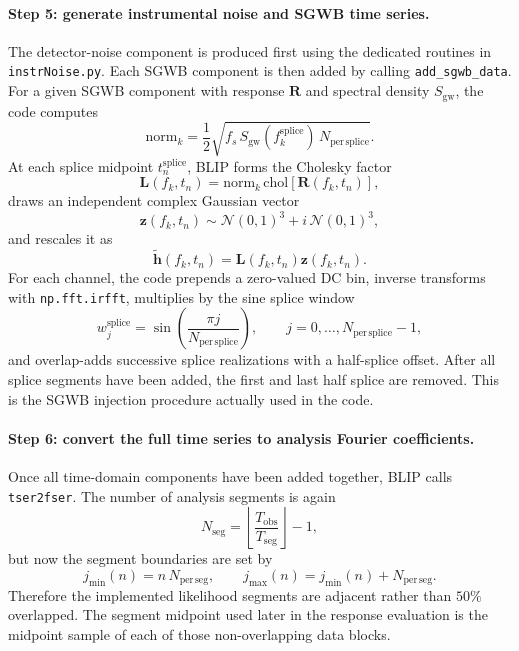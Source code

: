 \documentclass[11pt]{article}
\begin{document}
\paragraph{Step 5: generate instrumental noise and SGWB time series.}
The detector-noise component is produced first using the dedicated routines in \texttt{instrNoise.py}. Each SGWB component is then added by calling \texttt{add\_sgwb\_data}. For a given SGWB component with response $\mathbf{R}$ and spectral density $S_{\mathrm{gw}}$, the code computes
\begin{equation}
\mathrm{norm}_k=\frac{1}{2}\sqrt{f_s\,S_{\mathrm{gw}}(f_k^{\mathrm{splice}})\,N_{\mathrm{per\,splice}}}.
\end{equation}
At each splice midpoint $t_n^{\mathrm{splice}}$, BLIP forms the Cholesky factor
\begin{equation}
\mathbf{L}(f_k,t_n)
=\mathrm{norm}_k\,\mathrm{chol}\!\left[\mathbf{R}(f_k,t_n)\right],
\end{equation}
draws an independent complex Gaussian vector
\begin{equation}
\mathbf{z}(f_k,t_n)\sim
\mathcal{N}(0,1)^3+i\,\mathcal{N}(0,1)^3,
\end{equation}
and rescales it as
\begin{equation}
\tilde{\mathbf{h}}(f_k,t_n)=\mathbf{L}(f_k,t_n)\mathbf{z}(f_k,t_n).
\end{equation}
For each channel, the code prepends a zero-valued DC bin, inverse transforms with \texttt{np.fft.irfft}, multiplies by the sine splice window
\begin{equation}
w_j^{\mathrm{splice}}=\sin\!\left(\frac{\pi j}{N_{\mathrm{per\,splice}}}\right),
\qquad
j=0,\dots,N_{\mathrm{per\,splice}}-1,
\end{equation}
and overlap-adds successive splice realizations with a half-splice offset. After all splice segments have been added, the first and last half splice are removed. This is the SGWB injection procedure actually used in the code.

\paragraph{Step 6: convert the full time series to analysis Fourier coefficients.}
Once all time-domain components have been added together, BLIP calls \texttt{tser2fser}. The number of analysis segments is again
\begin{equation}
N_{\mathrm{seg}}=\left\lfloor \frac{T_{\mathrm{obs}}}{T_{\mathrm{seg}}}\right\rfloor-1,
\end{equation}
but now the segment boundaries are set by
\begin{equation}
j_{\min}(n)=n\,N_{\mathrm{per\,seg}},
\qquad
j_{\max}(n)=j_{\min}(n)+N_{\mathrm{per\,seg}}.
\end{equation}
Therefore the implemented likelihood segments are adjacent rather than $50\%$ overlapped. The segment midpoint used later in the response evaluation is the midpoint sample of each of those non-overlapping data blocks.
\end{document}
